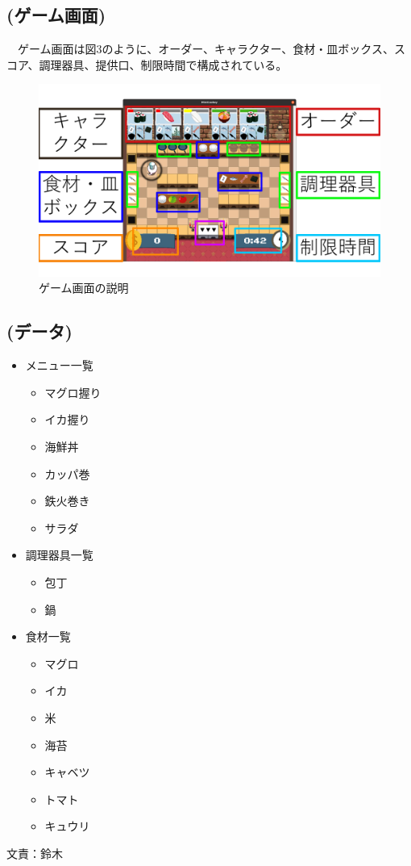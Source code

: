 \documentclass[a4j]{jarticle} %
\begin{document}
\subsection*{(ゲーム画面)}
　ゲーム画面は図3のように、オーダー、キャラクター、食材・皿ボックス、スコア、調理器具、提供口、制限時間で構成されている。
\begin{figure}[H]
  \begin{center}
  \includegraphics[scale=0.3]{img/game.png}
  \caption{ゲーム画面の説明}
  \end{center}
\end{figure}
\subsection*{(データ)}
\begin{itemize}
  \item メニュー一覧\par
    \begin{itemize}
      \item マグロ握り
      \item イカ握り
      \item 海鮮丼
      \item カッパ巻
      \item 鉄火巻き
      \item サラダ
    \end{itemize}
  \item 調理器具一覧\par
    \begin{itemize}
      \item 包丁
      \item 鍋
    \end{itemize}
  \item 食材一覧\par
    \begin{itemize}
      \item マグロ
      \item イカ
      \item 米
      \item 海苔
      \item キャベツ
      \item トマト
      \item キュウリ
    \end{itemize}     
\end{itemize}
文責：鈴木
\end{document}
